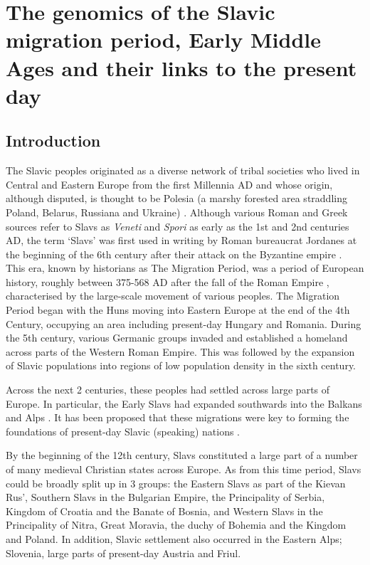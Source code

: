 \chapter{The genomics of the Slavic migration period, Early Middle Ages and their links to the present day}
\label{chapterlabel5}

\section{Introduction}

The Slavic peoples originated as a diverse network of tribal societies who lived in Central and Eastern Europe from the first Millennia AD \cite{barford2001early} and whose origin, although disputed, is thought to be Polesia (a marshy forested area straddling Poland, Belarus, Russiana and Ukraine) \cite{fouracre1995new}. Although various Roman and Greek sources refer to Slavs as \textit{Veneti} and \textit{Spori} as early as the 1st and 2nd centuries AD, the term `Slavs' was first used in writing by Roman bureaucrat Jordanes at the beginning of the 6th century after their attack on the Byzantine empire \cite{curta2006southeastern}. This era, known by historians as The Migration Period, was a period of European history, roughly between 375-568 AD after the fall of the Roman Empire \cite{halsall2007barbarian}, characterised by the large-scale movement of various peoples. The Migration Period began with the Huns moving into Eastern Europe at the end of the 4th Century, occupying an area including present-day Hungary and Romania. During the 5th century, various Germanic groups invaded and established a homeland across parts of the Western Roman Empire. This was followed by the expansion of Slavic populations into regions of low population density in the sixth century.

Across the next 2 centuries, these peoples had settled across large parts of Europe. In particular, the Early Slavs had expanded southwards into the Balkans and Alps \cite{barford2001early, brather2008archaologie, geary2003myth,gojda1991ancient}. It has been proposed that these migrations were key to forming the foundations of present-day Slavic (speaking) nations \cite{barford2001early}.  

By the beginning of the 12th century, Slavs constituted a large part of a number of many medieval Christian states across Europe. As from this time period, Slavs could be broadly split up in 3 groups: the Eastern Slavs as part of the Kievan Rus', Southern Slavs in the Bulgarian Empire, the Principality of Serbia, Kingdom of Croatia and the Banate of Bosnia, and Western Slavs in the Principality of Nitra, Great Moravia, the duchy of Bohemia and the Kingdom and Poland. In addition, Slavic settlement also occurred in the Eastern Alps; Slovenia, large parts of present-day Austria and Friul. 


